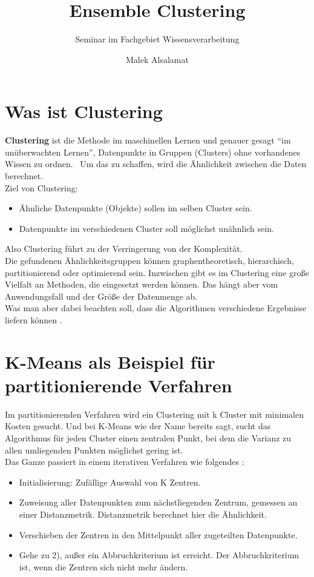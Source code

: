 \documentclass[runningheads]{llncs}
\title{Ensemble Clustering}
\subtitle{Seminar im Fachgebiet Wissensverarbeitung}
\author{Malek Alsalamat}
\institute{Universität Kassel}
\begin{document}
\maketitle	


  
\section{Was ist Clustering}
\textbf{Clustering} ist die Methode im maschinellen Lernen und genauer gesagt “im unüberwachten Lernen”, Datenpunkte in Gruppen (Clusters) ohne vorhandenes Wissen zu ordnen.  Um das zu schaffen, wird die Ähnlichkeit zwischen die Daten berechnet.\\[4pt]
Ziel von Clustering: 
\begin{itemize}
	\item Ähnliche Datenpunkte (Objekte) sollen im selben Cluster sein. 
	\item Datenpunkte im verschiedenen Cluster soll möglichst unähnlich sein.   
\end{itemize}
Also Clustering führt zu der Verringerung von der Komplexität.\\[4pt]
Die gefundenen Ähnlichkeitsgruppen können graphentheoretisch, hierarchisch, partitionierend oder optimierend sein. Inzwischen gibt es im Clustering eine große Vielfalt an Methoden, die eingesetzt werden können. Das hängt aber vom Anwendungsfall und der Größe der Datenmenge ab.\\[4pt]
Was man aber dabei beachten soll, dass die Algorithmen verschiedene Ergebnisse liefern können \cite{onlinequelle1}. 

\section{K-Means als Beispiel für partitionierende Verfahren}
Im partitionierenden Verfahren wird ein Clustering mit k Cluster mit minimalen Kosten gesucht. Und bei K-Means wie der Name bereits sagt, sucht das Algorithmus für jeden Cluster einen zentralen Punkt, bei dem die Varianz zu allen umliegenden Punkten möglichst gering ist.\\[4pt]
Das Ganze passiert in einem iterativen Verfahren wie folgendes \cite{onlinequelle1}:
\begin{itemize}
	\item Initialisierung: Zufällige Auswahl von K Zentren. 
	\item Zuweisung aller Datenpunkten zum nächstliegenden Zentrum, gemessen an einer Distanzmetrik. Distanzmetrik berechnet hier die Ähnlichkeit. 
	\item Verschieben der Zentren in den Mittelpunkt aller zugeteilten Datenpunkte.
	\item Gehe zu 2), außer ein Abbruchkriterium ist erreicht. Der Abbruchkriterium ist, wenn die Zentren sich nicht mehr ändern.    
\end{itemize}
\end{document}
